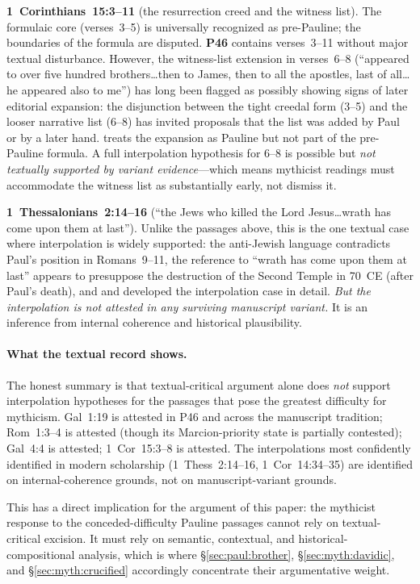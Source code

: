 \documentclass[12pt,oneside]{article}
\begin{document}
\textbf{1~Corinthians~15:3--11} (the resurrection creed and the
witness list).  The formulaic core (verses~3--5) is universally
recognized as pre-Pauline; the boundaries of the formula are
disputed.  \textbf{P46} contains verses~3--11 without major textual
disturbance.  However, the witness-list extension in verses~6--8
(\enquote{appeared to over five hundred brothers\ldots then to James,
then to all the apostles, last of all\ldots he appeared also to me})
has long been flagged as possibly showing signs of later editorial
expansion: the disjunction between the tight creedal form
(3--5) and the looser narrative list (6--8) has invited proposals
that the list was added by Paul or by a later hand.
\citet{Conzelmann1975} treats the expansion as Pauline but not part
of the pre-Pauline formula.  A full interpolation hypothesis for
6--8 is possible but \textit{not textually supported by variant
evidence}---which means mythicist readings must accommodate the
witness list as substantially early, not dismiss it.

\textbf{1~Thessalonians~2:14--16} (\enquote{the Jews who killed the
Lord Jesus\ldots wrath has come upon them at last}).  Unlike the
passages above, this is the one textual case where interpolation is
widely supported: the anti-Jewish language contradicts Paul's
position in Romans~9--11, the reference to \enquote{wrath has come
upon them at last} appears to presuppose the destruction of the
Second Temple in 70~CE (after Paul's death), and \citet{Pearson1971}
and \citet{Schmidt1983} developed the interpolation case in detail.
\textit{But the interpolation is not attested in any surviving
manuscript variant.}  It is an inference from internal coherence
and historical plausibility.

\paragraph{What the textual record shows.}
The honest summary is that textual-critical argument alone does
\textit{not} support interpolation hypotheses for the passages that
pose the greatest difficulty for mythicism.  Gal~1:19 is attested in
P46 and across the manuscript tradition; Rom~1:3--4 is attested
(though its Marcion-priority state is partially contested); Gal~4:4
is attested; 1~Cor~15:3--8 is attested.  The interpolations most
confidently identified in modern scholarship (1~Thess~2:14--16,
1~Cor~14:34--35) are identified on internal-coherence grounds, not
on manuscript-variant grounds.

This has a direct implication for the argument of this paper: the
mythicist response to the conceded-difficulty Pauline passages
cannot rely on textual-critical excision.  It must rely on semantic,
contextual, and historical-compositional analysis, which is where
§\ref{sec:paul:brother}, §\ref{sec:myth:davidic}, and
§\ref{sec:myth:crucified} accordingly concentrate their argumentative
weight.
\end{document}

